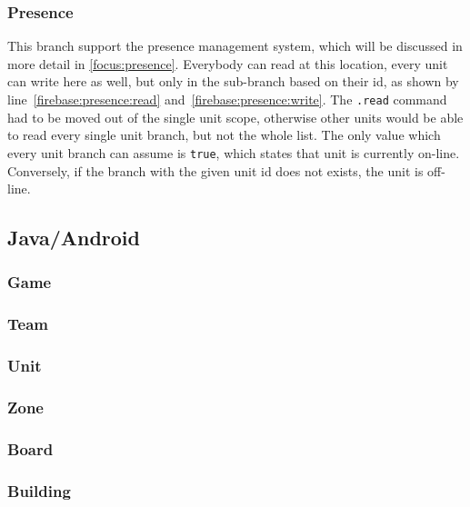			\subsubsection{Presence}\label{model:presence}
		
				
								
				This branch support the presence management system, which will be discussed in more detail in \autoref{focus:presence}.
				Everybody can read at this location, every unit can write here as well, but only in the sub-branch based on their id, as shown by line~\ref{firebase:presence:read} and~\ref{firebase:presence:write}.
				The \lstinline|.read| command had to be moved out of the single unit scope, otherwise other units would be able to read every single unit branch, but not the whole list.
				The only value which every unit branch can assume is \lstinline|true|, which states that unit is currently on-line. Conversely, if the branch with the given unit id does not exists, the unit is off-line.
		
		\subsection{Java/Android}
		
			\subsubsection{Game}
		
			\subsubsection{Team}
			
			\subsubsection{Unit}
			
			\subsubsection{Zone}
			
			\subsubsection{Board}
			
			\subsubsection{Building}
			
